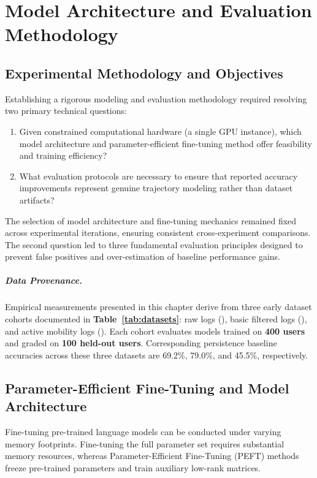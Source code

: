 \chapter{Model Architecture and Evaluation Methodology}
\label{ch:tools}

\section{Experimental Methodology and Objectives}

Establishing a rigorous modeling and evaluation methodology required resolving two primary technical questions:
\begin{enumerate}
  \item Given constrained computational hardware (a single GPU instance), which model architecture and parameter-efficient fine-tuning method offer feasibility and training efficiency?
  \item What evaluation protocols are necessary to ensure that reported accuracy improvements represent genuine trajectory modeling rather than dataset artifacts?
\end{enumerate}

The selection of model architecture and fine-tuning mechanics remained fixed across experimental iterations, ensuring consistent cross-experiment comparisons. The second question led to three fundamental evaluation principles designed to prevent false positives and over-estimation of baseline performance gains.

\paragraph{Data Provenance.} Empirical measurements presented in this chapter derive from three early dataset cohorts documented in \textbf{Table~\ref{tab:datasets}}: raw logs (\Draw{}), basic filtered logs (\Dfilt{}), and active mobility logs (\Dmob{}). Each cohort evaluates models trained on \textbf{400 users} and graded on \textbf{100 held-out users}. Corresponding persistence baseline accuracies across these three datasets are 69.2\%, 79.0\%, and 45.5\%, respectively.

\section{Parameter-Efficient Fine-Tuning and Model Architecture}
\label{sec:tools-peft}

Fine-tuning pre-trained language models can be conducted under varying memory footprints. Fine-tuning the full parameter set requires substantial memory resources, whereas Parameter-Efficient Fine-Tuning (PEFT) methods freeze pre-trained parameters and train auxiliary low-rank matrices.

